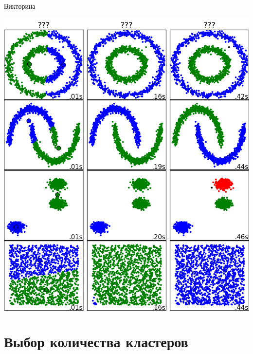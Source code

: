 \documentclass[10pt]{beamer}
\begin{document}
\begin{frame}{Викторина}

\begin{center}
\includegraphics[height=0.8\textheight]{images/quiz.png}
\end{center}

\end{frame}


\section{Выбор количества кластеров}

\end{document}
